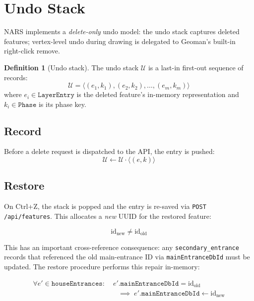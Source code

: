 \documentclass[12pt,a4paper]{article}
\theoremstyle{definition}
\newtheorem{definition}{Definition}[section]
\theoremstyle{plain}
\theoremstyle{remark}
\begin{document}
\section{Undo Stack}
\label{sec:undo}

NARS implements a \emph{delete-only} undo model: the undo stack captures
deleted features; vertex-level undo during drawing is delegated to Geoman's
built-in right-click remove.

\begin{definition}[Undo stack]
The undo stack $\mathcal{U}$ is a last-in first-out sequence of records:
\begin{equation}
  \mathcal{U} = \langle (e_1, k_1), (e_2, k_2), \ldots, (e_m, k_m) \rangle
  \label{eq:undo_stack}
\end{equation}
where $e_i \in \texttt{LayerEntry}$ is the deleted feature's in-memory
representation and $k_i \in \texttt{Phase}$ is its phase key.
\end{definition}

\subsection{Record}

Before a delete request is dispatched to the API, the entry is pushed:
\begin{equation}
  \mathcal{U} \leftarrow \mathcal{U} \cdot \langle (e, k) \rangle
  \label{eq:undo_push}
\end{equation}

\subsection{Restore}

On Ctrl+Z, the stack is popped and the entry is re-saved via
\texttt{POST /api/features}. This allocates a \emph{new} UUID for the
restored feature:

\begin{equation}
  \text{id}_{\text{new}} \neq \text{id}_{\text{old}}
  \label{eq:undo_new_id}
\end{equation}

This has an important cross-reference consequence: any
\texttt{secondary\_entrance} records that referenced the old main-entrance
ID via \texttt{mainEntranceDbId} must be updated. The restore procedure
performs this repair in-memory:

\begin{equation}
  \begin{aligned}
    \forall e' \in \texttt{houseEntrances}:&\;
    e'.\texttt{mainEntranceDbId} = \text{id}_{\text{old}} \\
    &\quad\implies\;
    e'.\texttt{mainEntranceDbId} \leftarrow \text{id}_{\text{new}}
  \end{aligned}
  \label{eq:undo_ref_repair}
\end{equation}
\end{document}

